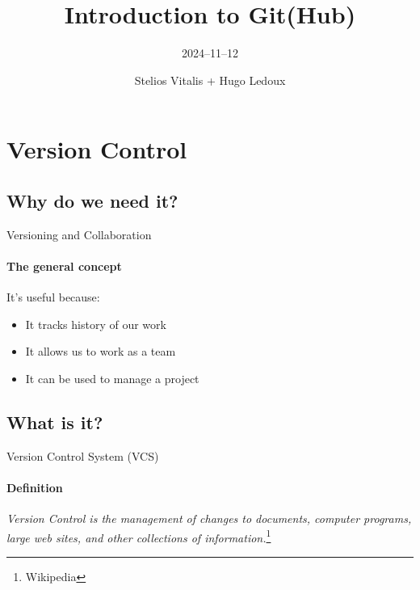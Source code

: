 \documentclass[aspectratio=169]{beamer}
\title{Introduction to Git(Hub)} %
\subtitle{2024--11--12} %
\author{Stelios Vitalis + Hugo Ledoux}
\begin{document}
  \frame{\maketitle}


	\section{Version Control}
\subsection{Why do we need it?}
\begin{frame}{Versioning and Collaboration}
\framesubtitle{The general concept}
It's useful because:
\begin{itemize}
	\item It tracks history of our work
	\item It allows us to work as a team
	\item It can be used to manage a project
\end{itemize}
\end{frame}


\subsection{What is it?}
\begin{frame}{Version Control System (VCS)}
\framesubtitle{Definition}

\begin{definition}
	\emph{Version Control is the \alert{management} of changes to documents, computer programs, large web sites, and other collections of information.}\footnote[frame]{Wikipedia}
\end{definition}
\end{frame}
\end{document}
